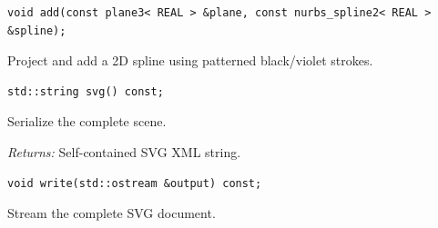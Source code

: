 \par\noindent\begin{minipage}{\linewidth}
\begin{lstlisting}[style=apireference]
void add(const plane3< REAL > &plane, const nurbs_spline2< REAL > &spline);
\end{lstlisting}
{\footnotesize Project and add a 2D spline using patterned black/violet strokes.\par}
\end{minipage}\par\vspace{1pt}
\par\noindent\begin{minipage}{\linewidth}
\begin{lstlisting}[style=apireference]
std::string svg() const;
\end{lstlisting}
{\footnotesize Serialize the complete scene.\par}
{\footnotesize\textit{Returns:} Self-contained SVG XML string.\par}
\end{minipage}\par\vspace{1pt}
\par\noindent\begin{minipage}{\linewidth}
\begin{lstlisting}[style=apireference]
void write(std::ostream &output) const;
\end{lstlisting}
{\footnotesize Stream the complete SVG document.\par}
\end{minipage}\par\vspace{1pt}
